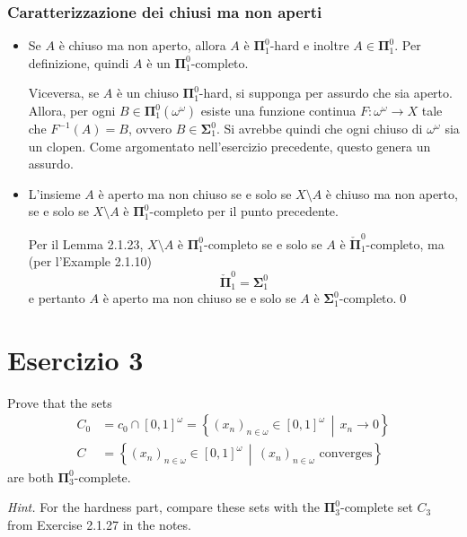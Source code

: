 \documentclass{article}
\newcommand{\1}{\mathds{1}}
\renewcommand{\href}[2]{#2}
\begin{document}
\subsubsection{Caratterizzazione dei chiusi ma non aperti}
\label{sec:orgfe296a3}

\begin{itemize}
\item Se \(A\) è chiuso ma non aperto, allora \(A\) è \(\bm{\Pi}_{1}^{0}\)-hard e inoltre \(A \in \bm{\Pi}_{1}^{0}\). Per definizione, quindi \(A\) è un \(\bm{\Pi}_{1}^{0}\)-completo.

Viceversa, se \(A\) è un chiuso \(\bm{\Pi}_{1}^{0}\)-hard, si supponga per assurdo che sia aperto. Allora, per ogni \(B \in \bm{\Pi}_{1}^{0}(\omega^{\omega})\) esiste una funzione continua \(F:\omega^{\omega}\to X\) tale che \(F^{-1}(A) = B\), ovvero \(B \in \bm{\Sigma}_{1}^{0}\). Si avrebbe quindi che ogni chiuso di \(\omega^{\omega}\) sia un clopen. Come argomentato nell'\href{../../../../../../org/roam/20250505103058-caratterizzazione_dei_punti_non_isolati_di_uno_spazio_polacco.org}{esercizio precedente}, questo genera un assurdo.
\item L'insieme \(A\) è aperto ma non chiuso se e solo se \(X\setminus A\) è chiuso ma non aperto, se e solo se \(X\setminus A\) è \(\bm{\Pi}_{1}^{0}\)-completo per il punto precedente.

Per il Lemma 2.1.23, \(X\setminus A\) è \(\bm{\Pi}_{1}^{0}\)-completo se e solo se \(A\) è \(\check{\bm{\Pi}}_{1}^{0}\)-completo, ma (per l'Example 2.1.10)
\begin{equation*}
  	\check{\bm{\Pi}}_{1}^{0}=\bm{\Sigma}_{1}^{0}
\end{equation*}
e pertanto \(A\) è aperto ma non chiuso se e solo se \(A\) è \(\bm{\Sigma}_{1}^{0}\)-completo.\qed
\end{itemize}
\section{Esercizio 3}
\label{sec:org056271b}

Prove that the sets
\begin{align*}
C_0 &= c_0 \cap [0,1]^\omega = \left\{(x_n)_{n \in \omega} \in [0,1]^\omega \,\middle|\, x_n \to 0 \right\}\\
C &= \left\{(x_n)_{n \in \omega} \in [0,1]^\omega \,\middle|\, (x_n)_{n \in \omega} \text{ converges} \right\}
\end{align*}
are both \(\bm{\Pi}^0_3\)-complete.

\emph{Hint.} For the hardness part, compare these sets with the \(\bm{\Pi}^0_3\)-complete set \(C_3\) from Exercise 2.1.27 in the notes.
\end{document}
